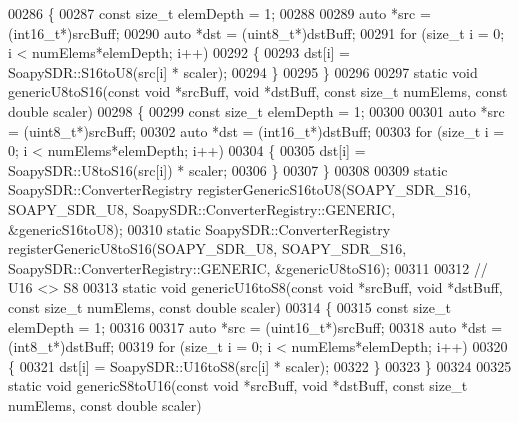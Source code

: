 \begin{DoxyCode}
00286 \{
00287   \textcolor{keyword}{const} \textcolor{keywordtype}{size\_t} elemDepth = 1;
00288 
00289   \textcolor{keyword}{auto} *src = (int16\_t*)srcBuff;
00290   \textcolor{keyword}{auto} *dst = (uint8\_t*)dstBuff;
00291   \textcolor{keywordflow}{for} (\textcolor{keywordtype}{size\_t} i = 0; i < numElems*elemDepth; i++)
00292     \{
00293       dst[i] = SoapySDR::S16toU8(src[i] * scaler);
00294     \}
00295 \}
00296 
00297 \textcolor{keyword}{static} \textcolor{keywordtype}{void} genericU8toS16(\textcolor{keyword}{const} \textcolor{keywordtype}{void} *srcBuff, \textcolor{keywordtype}{void} *dstBuff, \textcolor{keyword}{const} \textcolor{keywordtype}{size\_t} numElems, \textcolor{keyword}{const} \textcolor{keywordtype}{double} scaler)
00298 \{
00299   \textcolor{keyword}{const} \textcolor{keywordtype}{size\_t} elemDepth = 1;
00300 
00301   \textcolor{keyword}{auto} *src = (uint8\_t*)srcBuff;
00302   \textcolor{keyword}{auto} *dst = (int16\_t*)dstBuff;
00303   \textcolor{keywordflow}{for} (\textcolor{keywordtype}{size\_t} i = 0; i < numElems*elemDepth; i++)
00304     \{
00305       dst[i] = SoapySDR::U8toS16(src[i]) * scaler;
00306     \}
00307 \}
00308 
00309 \textcolor{keyword}{static} SoapySDR::ConverterRegistry registerGenericS16toU8(SOAPY_SDR_S16, 
      SOAPY_SDR_U8, SoapySDR::ConverterRegistry::GENERIC, &genericS16toU8);
00310 \textcolor{keyword}{static} SoapySDR::ConverterRegistry registerGenericU8toS16(SOAPY_SDR_U8, 
      SOAPY_SDR_S16, SoapySDR::ConverterRegistry::GENERIC, &genericU8toS16);
00311 
00312 \textcolor{comment}{// U16 <> S8}
00313 \textcolor{keyword}{static} \textcolor{keywordtype}{void} genericU16toS8(\textcolor{keyword}{const} \textcolor{keywordtype}{void} *srcBuff, \textcolor{keywordtype}{void} *dstBuff, \textcolor{keyword}{const} \textcolor{keywordtype}{size\_t} numElems, \textcolor{keyword}{const} \textcolor{keywordtype}{double} scaler)
00314 \{
00315   \textcolor{keyword}{const} \textcolor{keywordtype}{size\_t} elemDepth = 1;
00316 
00317   \textcolor{keyword}{auto} *src = (uint16\_t*)srcBuff;
00318   \textcolor{keyword}{auto} *dst = (int8\_t*)dstBuff;
00319   \textcolor{keywordflow}{for} (\textcolor{keywordtype}{size\_t} i = 0; i < numElems*elemDepth; i++)
00320     \{
00321       dst[i] = SoapySDR::U16toS8(src[i] * scaler);
00322     \}
00323 \}
00324 
00325 \textcolor{keyword}{static} \textcolor{keywordtype}{void} genericS8toU16(\textcolor{keyword}{const} \textcolor{keywordtype}{void} *srcBuff, \textcolor{keywordtype}{void} *dstBuff, \textcolor{keyword}{const} \textcolor{keywordtype}{size\_t} numElems, \textcolor{keyword}{const} \textcolor{keywordtype}{double} scaler)

\end{DoxyCode}
